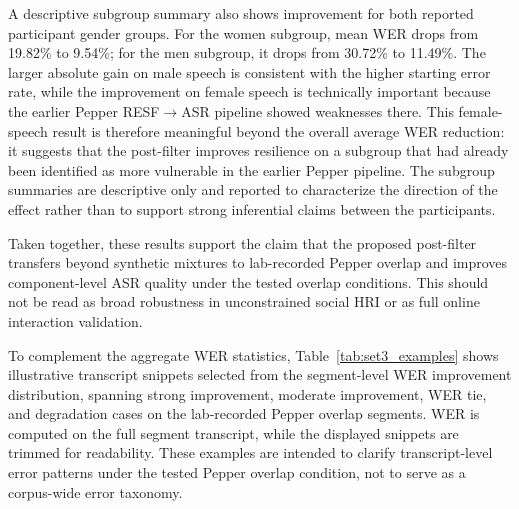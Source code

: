 \documentclass[manuscript,screen,review]{acmart}
\begin{document}
A descriptive subgroup summary also shows improvement for both reported participant gender groups. For the women subgroup, mean WER drops from 19.82\% to 9.54\%; for the men subgroup, it drops from 30.72\% to 11.49\%. The larger absolute gain on male speech is consistent with the higher starting error rate, while the improvement on female speech is technically important because the earlier Pepper RESF$\rightarrow$ASR pipeline showed weaknesses there. This female-speech result is therefore meaningful beyond the overall average WER reduction: it suggests that the post-filter improves resilience on a subgroup that had already been identified as more vulnerable in the earlier Pepper pipeline. The subgroup summaries are descriptive only and reported to characterize the direction of the effect rather than to support strong inferential claims between the participants.

Taken together, these results support the claim that the proposed post-filter transfers beyond synthetic mixtures to lab-recorded Pepper overlap and improves component-level ASR quality under the tested overlap conditions. This should not be read as broad robustness in unconstrained social HRI or as full online interaction validation.

To complement the aggregate WER statistics, Table~\ref{tab:set3_examples} shows illustrative transcript snippets selected from the segment-level WER improvement distribution, spanning strong improvement, moderate improvement, WER tie, and degradation cases on the lab-recorded Pepper overlap segments. WER is computed on the full segment transcript, while the displayed snippets are trimmed for readability. These examples are intended to clarify transcript-level error patterns under the tested Pepper overlap condition, not to serve as a corpus-wide error taxonomy.
\end{document}
